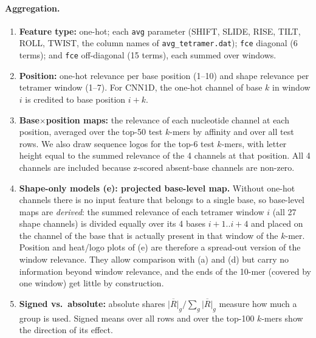 \paragraph{Aggregation.}
\begin{enumerate}
\item \textbf{Feature type:} one-hot; each \texttt{avg} parameter (SHIFT, SLIDE, RISE, TILT, ROLL, TWIST, the column names of \texttt{avg\_tetramer.dat}); \texttt{fce} diagonal (6 terms); and \texttt{fce} off-diagonal (15 terms), each summed over windows.
\item \textbf{Position:} one-hot relevance per base position (1--10) and shape relevance per tetramer window (1--7). For CNN1D, the one-hot channel of base $k$ in window $i$ is credited to base position $i{+}k$.
\item \textbf{Base$\times$position maps:} the relevance of each nucleotide channel at each position, averaged over the top-50 test $k$-mers by affinity and over all test rows. We also draw sequence logos for the top-6 test $k$-mers, with letter height equal to the summed relevance of the 4 channels at that position. All 4 channels are included because z-scored absent-base channels are non-zero.
\item \textbf{Shape-only models (e): projected base-level map.} Without one-hot channels there is no input feature that belongs to a single base, so base-level maps are \emph{derived}: the summed relevance of each tetramer window $i$ (all 27 shape channels) is divided equally over its 4 bases $i{+}1..i{+}4$ and placed on the channel of the base that is actually present in that window of the $k$-mer. Position and heat/logo plots of (e) are therefore a spread-out version of the window relevance. They allow comparison with (a) and (d) but carry no information beyond window relevance, and the ends of the 10-mer (covered by one window) get little by construction.
\item \textbf{Signed vs.\ absolute:} absolute shares $\overline{|R|}_g/\sum_g\overline{|R|}_g$ measure how much a group is used. Signed means over all rows and over the top-100 $k$-mers show the direction of its effect.
\end{enumerate}
